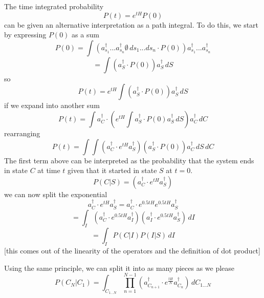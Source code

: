 \documentclass[letterpaper,twocolumn,10pt]{article}
\begin{document}
The time integrated probability 
\begin{equation}
P(t) = e^{tH}P(0)
\label{timeint}
\end{equation}
can be given an alternative interpretation as a path integral. To do this, we start by expressing $P(0)$ as a sum
\[
P(0) = \int (a_{s_1}^\dag...a_{s_n}^\dag\emptyset \, ds_1...ds_n \cdot P(0))a_{s_1}^{\dag}...a_{s_n}^{\dag}
\]
\[
 = \int (a_S^\dag \cdot P(0)) a_S^\dag \, dS
\]
so
\[
P(t) = e^{tH}\int (a_S^{\dag} \cdot P(0)) a_S^{\dag} \, dS
\]
if we expand into another sum
\[
P(t) = \int a_C^\dag \cdot \left(e^{tH}\int a_S^{\dag} \cdot P(0) a_S^{\dag} \, dS\right) a_C^\dag \, dC
\]
rearranging
\[
P(t) = \int \int \left(a_C^\dag \cdot e^{tH} a_S^{\dag}\right)\left( a_S^{\dag} \cdot P(0) \right) a_C^\dag \, dS\, dC
\]
The first term above can be interpreted as the probability that the system ends in state $C$ at time $t$ given that it started in state $S$ at $t=0$. 
\[
P(C|S) = \left(a_C^\dag \cdot e^{tH} a_S^{\dag}\right)
\]
we can now split the exponential
\[
a_C^\dag\cdot e^{tH} a_S^{\dag} = a_C^{\dag}\cdot e^{0.5tH} e^{0.5tH} a_S^{\dag}
\]
\[
 = \int_I (a_C^{\dag}\cdot e^{0.5tH}a_I^{\dag}) (a_I^{\dag} \cdot e^{0.5tH}a_S^{\dag})\,dI
\]
\[
= \int_I P(C|I)P(I|S) \,dI
\]
[this comes out of the linearity of the operators and the definition of dot product]

Using the same principle, we can split it into as many pieces as we please
\[
P(C_N|C_1) = \int_{C_{1...N}} \prod_{n=1}^{N-1} (a_{C_{n+1}}^\dag \cdot e^\frac{tH}{N}a_{C_n}^\dag) \,dC_{1...N}
\]
\end{document}
